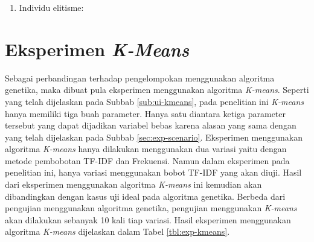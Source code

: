 \begin{enumerate}
		\begin{figure}[H]
			\centering
			\texttt{[image: grafik-mutation-purity]}
			\caption{Grafik hubungan probabilitas mutasi dengan nilai \textit{purity}}
			\label{fig:graph:mutation-purity}
		\end{figure}
		
		Berdasarkan nilai \textit{purity} pada grafik dalam Gambar \ref{fig:graph:mutation-purity}, hasil terbaik didapatkan dengan menggunakan probabilitas mutasi 0.05. Nilai \textit{purity} dengan menggunakan probabilitas mutasi 0.05 lebih baik 26\% dibandingkan dengan menggunakan probabilitas mutasi 0 dan lebih baik 82\% dibandingkan menggunakan probabilitas mutasi 0.25.
		
		\item Individu elitisme:
\end{enumerate}

\section{Eksperimen \textit{K-Means}}
Sebagai perbandingan terhadap pengelompokan menggunakan algoritma genetika, maka dibuat pula eksperimen menggunakan algoritma \textit{K-means}. Seperti yang telah dijelaskan pada Subbab \ref{sub:ui-kmeans}, pada penelitian ini \textit{K-means} hanya memiliki tiga buah parameter. Hanya satu diantara ketiga parameter tersebut yang dapat dijadikan variabel bebas karena alasan yang sama dengan yang telah dijelaskan pada Subbab \ref{sec:exp-scenario}. Eksperimen menggunakan algoritma \textit{K-means} hanya dilakukan menggunakan dua variasi yaitu dengan metode pembobotan TF-IDF dan Frekuensi. Namun dalam eksperimen pada penelitian ini, hanya variasi menggunakan bobot TF-IDF yang akan diuji. Hasil dari eksperimen menggunakan algoritma \textit{K-means} ini kemudian akan dibandingkan dengan kasus uji ideal pada algoritma genetika. Berbeda dari pengujian menggunakan algoritma genetika, pengujian menggunakan \textit{K-means} akan dilakukan sebanyak 10 kali tiap variasi. Hasil eksperimen menggunakan algoritma \textit{K-means} dijelaskan dalam Tabel \ref{tbl:exp-kmeans}.

